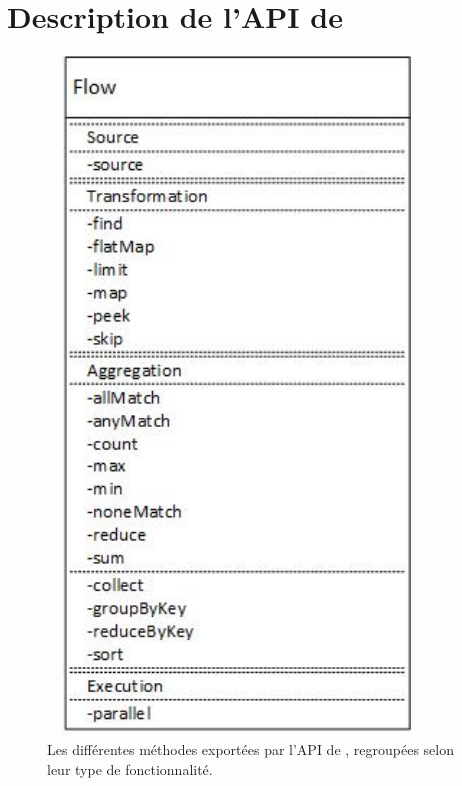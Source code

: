 
\chapter{Description de l'API de \PpFf}
\label{description.chap}




\begin{figure}
\centering
     \includegraphics[height=18cm, width=10cm]{Figures/MethodsAPI.jpg}
      \caption{Les diff\'erentes m\'ethodes export\'ees par l'{API} de \ppff,
     regroup\'ees selon leur type de fonctionnalit\'e.}
       \label{MethodesAPI.fig}
\end{figure}




